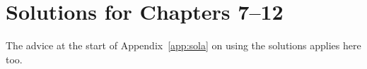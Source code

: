 \chapter{Solutions for Chapters 7--12}\label{app:solb}
The advice at the start of Appendix~\ref{app:sola} on using the solutions applies here too.







